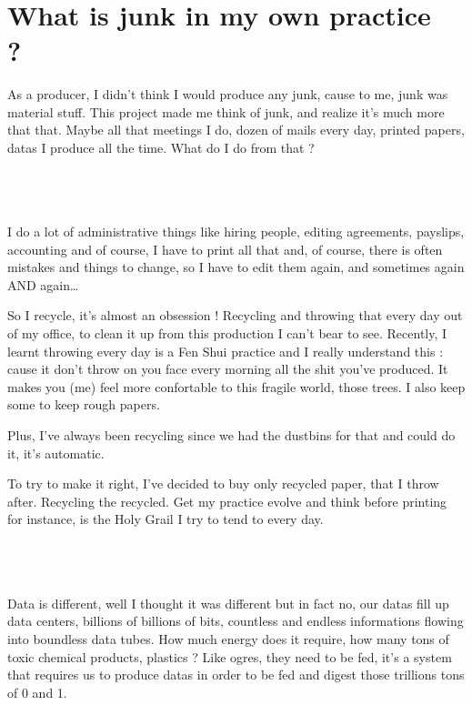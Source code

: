 ~


\section[What is junk in my own practice ?~]{\rmfamily What is junk in
my own practice ?~}
As a producer, I didn{\textquoteright}t think I would produce any junk,
cause to me, junk was material stuff. This project made me think of
junk, and realize it{\textquoteright}s much more that that. Maybe all
that meetings I do, dozen of mails every day, printed papers, datas I
produce all the time. What do I do from that ?

~

\section[Papers]{}
I do a lot of administrative things like hiring people, editing
agreements, payslips, accounting and of course, I have to print all
that and, of course, there is often mistakes and things to change, so I
have to edit them again, and sometimes again AND again{\dots}

So I recycle, it{\textquoteright}s almost an obsession ! Recycling and
throwing that every day out of my office, to clean it up from this
production I can{\textquoteright}t bear to see. Recently, I learnt
throwing every day is a Fen Shui practice and I really understand this
: cause it don{\textquoteright}t throw on you face every morning all
the shit you{\textquoteright}ve produced. It makes you (me) feel more
confortable to this fragile world, those trees. I also keep some to
keep rough papers.

Plus, I{\textquoteright}ve always been recycling since we had the
dustbins for that and could do it, it{\textquoteright}s automatic.

To try to make it right, I{\textquoteright}ve decided to buy only
recycled paper, that I throw after. Recycling the recycled. Get my
practice evolve and think before printing for instance, is the Holy
Grail I try to tend to every day.

~

\section[Datas]{}
Data is different, well I thought it was different but in fact no, our
datas fill up data centers, billions of billions of bits, countless and
endless informations flowing into boundless data tubes. How much energy
does it require, how many tons of toxic chemical products, plastics ?
Like ogres, they need to be fed, it{\textquoteright}s a system that
requires us to produce datas in order to be fed and digest those
trillions tons of 0 and 1.

